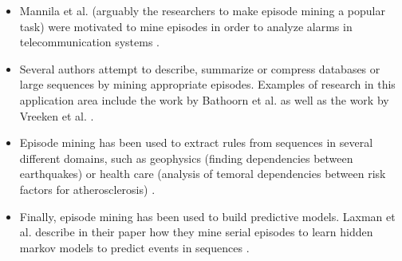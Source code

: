 \begin{itemize}
	\item Mannila et al. (arguably the researchers to make episode mining a popular task) were motivated to mine episodes in order to analyze alarms in telecommunication systems \cite{mannila1997discovery}.
	\item Several authors attempt to describe, summarize or compress databases or large sequences by mining appropriate episodes. Examples of research in this application area include the work by Bathoorn et al. \cite{bathoorn2007finding} as well as the work by Vreeken et al. \cite{vreeken2012summarising}.
	\item Episode mining has been used to extract rules from sequences in several different domains, such as geophysics (finding dependencies between earthquakes) \cite{meger2004constraint} or health care (analysis of temoral dependencies between risk factors for atherosclerosis) \cite{meger2004mining}.
	\item Finally, episode mining has been used to build predictive models. Laxman et al. describe in their paper how they mine serial episodes to learn hidden markov models to predict events in sequences \cite{laxman2008stream}. 
\end{itemize}

